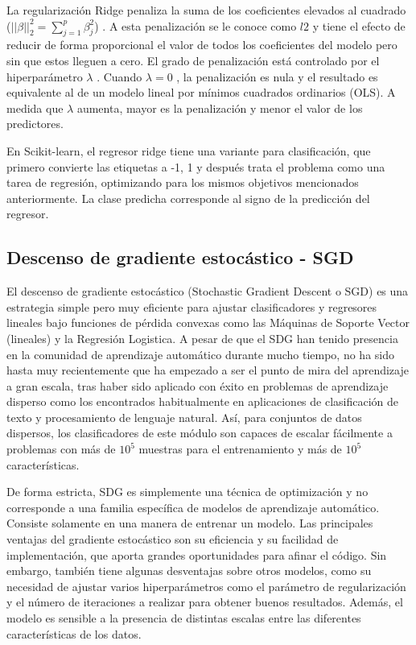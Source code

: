 La regularización Ridge penaliza la suma de los coeficientes elevados al cuadrado  ($||\beta||_{2}^{2}=\sum^{p}_{j=1}\beta^{2}_{j}$) . 
A esta penalización se le conoce como $l2$ y tiene el efecto de reducir de forma proporcional el valor de todos los coeficientes del modelo pero sin que estos lleguen a cero. El grado de penalización está controlado por el hiperparámetro  $\lambda$ . Cuando  $\lambda=0$ , la penalización es nula y el resultado es equivalente al de un modelo lineal por mínimos cuadrados ordinarios (OLS). A medida que  $\lambda$  aumenta, mayor es la penalización y menor el valor de los predictores.


En Scikit-learn, el regresor ridge tiene una variante para clasificación, que primero convierte las etiquetas a {-1, 1} y después trata el problema como una tarea de regresión, optimizando para los mismos objetivos mencionados anteriormente. La clase predicha corresponde al signo de la predicción del regresor.

\subsection{Descenso de gradiente estocástico - SGD}


El descenso de gradiente estocástico (Stochastic Gradient Descent o SGD) es una estrategia simple pero muy eficiente para ajustar clasificadores y regresores lineales bajo funciones de pérdida convexas como las Máquinas de Soporte Vector (lineales) y la Regresión Logistica.
A pesar de que el SDG han tenido presencia en la comunidad de aprendizaje automático durante mucho tiempo,
no ha sido hasta muy recientemente que ha empezado a ser el punto de mira del aprendizaje a gran escala,
tras haber sido aplicado con éxito en problemas de aprendizaje disperso como los encontrados habitualmente en aplicaciones de clasificación de texto y procesamiento de lenguaje natural.
Así, para conjuntos de datos dispersos,
los clasificadores de este módulo son capaces de escalar fácilmente a problemas con más de $10^{5}$ muestras para el entrenamiento y más de $10^{5}$ características.

De forma estricta, SDG es simplemente una técnica de optimización y no corresponde a una familia específica de modelos de aprendizaje automático. 
Consiste solamente en una manera de entrenar un modelo.
Las principales ventajas del gradiente estocástico son su eficiencia y su facilidad de implementación, que aporta grandes oportunidades para afinar el código.
Sin embargo, también tiene algunas desventajas sobre otros modelos, como su necesidad de ajustar varios hiperparámetros como el parámetro de regularización y el número de iteraciones a realizar para obtener buenos resultados.
Además, el modelo es sensible a la presencia de distintas escalas entre las diferentes características de los datos.

